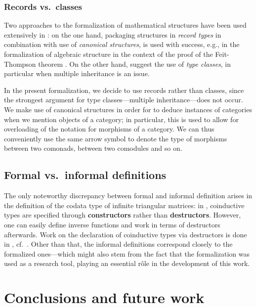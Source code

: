 \documentclass{amsart}
\newcommand{\fat}[1]{\textbf{#1}}
\begin{document}
\subsubsection{Records vs.\ classes}
Two approaches to the formalization of mathematical structures have been used extensively in \coq: on the one hand, packaging structures
in \emph{record types}  in combination with use of \emph{canonical structures}, is used with success, e.g., in 
the formalization of algebraic structure in the context of the proof of the Feit-Thompson theorem \parencite{DBLP:conf/tphol/GarillotGMR09}.
On the other hand, \textcite{DBLP:journals/mscs/SpittersW11} suggest the use of \emph{type classes}, in particular when multiple inheritance
is an issue.

In the present formalization, we decide to use records rather than classes, since the strongest argument for type classes---multiple inheritance---does 
not occur.
We make use of canonical structures in order for \coq to deduce instances of categories when we mention objects of a category; 
in particular, this is used to allow for overloading of the notation for morphisms of a category.
We can thus conveniently use the same arrow symbol to denote the type of morphisms between two comonads, between two comodules and so on.


\subsection{Formal vs.\ informal definitions}

The only noteworthy discrepancy between formal and informal definition arises in the definition of the codata type of infinite 
triangular matrices:
in \coq, coinductive types are specified through \fat{constructors} rather than \fat{destructors}.
However, one can easily define inverse functions and work in terms of destructors afterwards.
Work on the declaration of coinductive types via destructors is done in \agda, cf.\ \parencite{DBLP:conf/popl/AbelPTS13}.
Other than that, the informal definitions correspond closely to the formalized ones---which might also stem from the fact that 
the formalization was used as a research tool, playing an essential r\^ole in the development of this work.

\section{Conclusions and future work}
\end{document}

